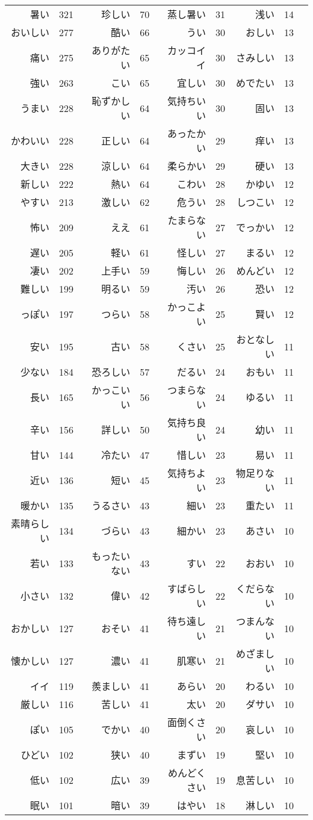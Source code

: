 \begin{longtable}{rrrrrrrrr}
暑い & 321 & 珍しい & 70 & 蒸し暑い & 31 & 浅い & 14 \\
おいしい & 277 & 酷い & 66 & うい & 30 & おしい & 13 \\
痛い & 275 & ありがたい & 65 & カッコイイ & 30 & さみしい & 13 \\
強い & 263 & こい & 65 & 宜しい & 30 & めでたい & 13 \\
うまい & 228 & 恥ずかしい & 64 & 気持ちいい & 30 & 固い & 13 \\
かわいい & 228 & 正しい & 64 & あったかい & 29 & 痒い & 13 \\
大きい & 228 & 涼しい & 64 & 柔らかい & 29 & 硬い & 13 \\
新しい & 222 & 熱い & 64 & こわい & 28 & かゆい & 12 \\
やすい & 213 & 激しい & 62 & 危うい & 28 & しつこい & 12 \\
怖い & 209 & ええ & 61 & たまらない & 27 & でっかい & 12 \\
遅い & 205 & 軽い & 61 & 怪しい & 27 & まるい & 12 \\
凄い & 202 & 上手い & 59 & 悔しい & 26 & めんどい & 12 \\
難しい & 199 & 明るい & 59 & 汚い & 26 & 恐い & 12 \\
っぽい & 197 & つらい & 58 & かっこよい & 25 & 賢い & 12 \\
安い & 195 & 古い & 58 & くさい & 25 & おとなしい & 11 \\
少ない & 184 & 恐ろしい & 57 & だるい & 24 & おもい & 11 \\
長い & 165 & かっこいい & 56 & つまらない & 24 & ゆるい & 11 \\
辛い & 156 & 詳しい & 50 & 気持ち良い & 24 & 幼い & 11 \\
甘い & 144 & 冷たい & 47 & 惜しい & 23 & 易い & 11 \\
近い & 136 & 短い & 45 & 気持ちよい & 23 & 物足りない & 11 \\
暖かい & 135 & うるさい & 43 & 細い & 23 & 重たい & 11 \\
素晴らしい & 134 & づらい & 43 & 細かい & 23 & あさい & 10 \\
若い & 133 & もったいない & 43 & すい & 22 & おおい & 10 \\
小さい & 132 & 偉い & 42 & すばらしい & 22 & くだらない & 10 \\
おかしい & 127 & おそい & 41 & 待ち遠しい & 21 & つまんない & 10 \\
懐かしい & 127 & 濃い & 41 & 肌寒い & 21 & めざましい & 10 \\
イイ & 119 & 羨ましい & 41 & あらい & 20 & わるい & 10 \\
厳しい & 116 & 苦しい & 41 & 太い & 20 & ダサい & 10 \\
ぽい & 105 & でかい & 40 & 面倒くさい & 20 & 哀しい & 10 \\
ひどい & 102 & 狭い & 40 & まずい & 19 & 堅い & 10 \\
低い & 102 & 広い & 39 & めんどくさい & 19 & 息苦しい & 10 \\
眠い & 101 & 暗い & 39 & はやい & 18 & 淋しい & 10 \\
\hline
\end{longtable}

